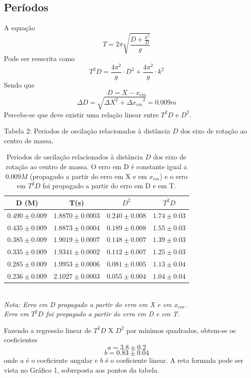 \documentclass[12pt,a4paper]{article}
\begin{document}
\subsection{Períodos}
A equação $$ T = 2\pi\sqrt{\frac{D + \frac{k^2}{D}}{g}} $$ 
Pode ser reescrita como 
\begin{equation} \label{eq:funcao}
 T^2D = \frac{4\pi^2}{g} \cdot D^2 + \frac{4\pi^2}{g} \cdot k^2 
\end{equation}
Sendo que $$D = X - x_{cm} $$ 
$$ \Delta D = \sqrt{{\Delta X}^2 + {\Delta x_{cm}}^2}  = 0.009 m$$
Percebe-se que deve existir uma relação linear entre $T^2D$ e $D^2$.
\newpage


  
\begin{table}[!htbp]
\caption{Periodos de oscilação relacionados à distância $D$ dos eixo de rotação ao centro de massa. O erro em D é constante igual a $0.009 M$ (propagado a partir do erro em X e em $x_{cm}$) e o erro em $T^2D$ foi propagado a partir do erro em D e em T.}
\def\arraystretch{1.5}

{Tabela 2: Periodos de oscilação relacionados à distância $D$ dos eixo de rotação ao centro de massa.}\\[10pt]

\begin{tabular}{|c|c|c|c|}
\hline
D (M)& T(s) & $D^2$ & $T^2D$ \\
\hline
$0.490\pm0.009$ & $1.8870 \pm 0.0003$ & $0.240\pm0.008$ & $1.74 \pm 0.03$\\
\hline
$0.435\pm0.009$ & $1.8873 \pm 0.0004$ & $0.189\pm0.008$ & $1.55 \pm 0.03$\\
\hline
$0.385\pm0.009$ & $1.9019 \pm 0.0007$ & $0.148\pm0.007$ & $1.39 \pm 0.03$\\
\hline
$0.335\pm0.009$ & $1.9341 \pm 0.0002$ & $0.112\pm0.007$ & $1.25 \pm 0.03$\\
\hline
$0.285\pm0.009$ & $1.9953 \pm 0.0006$ & $0.081\pm0.005$ & $1.13 \pm 0.04$\\
\hline
$0.236\pm0.009$ & $2.1027 \pm 0.0003$ & $0.055\pm0.004$ & $1.04 \pm 0.04$\\
\hline
\end{tabular}
\\
\emph {Nota: Erro em D propagado a partir do erro em X e em $x_{cm}$.\\
			Erro em $T^2D$ foi propagado a partir do erro em D e em T.\\}
\end{table}

Fazendo a regressão linear de $T^2D$ X $D^2$ por mínimos quadrados, obtem-se os coeficientes $$ a = 3.8 \pm 0.2 $$  $$ b = 0.83 \pm 0.04 $$ onde $a$ é o coeficiente angular e $b$ é o coeficiente linear. A reta formada pode ser vista no Gráfico 1, sobreposta aos pontos da tabela.
\end{document}
